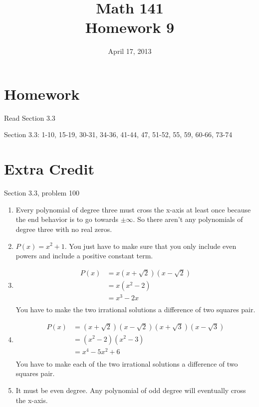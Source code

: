 \documentclass{exam}
\date{April 17, 2013}
\author{}
\title{Math 141 \\ Homework 9}
\begin{document}
  \maketitle

  \section{Homework}

  \begin{itemize*}
    \item Read Section 3.3
    \item Section 3.3: 1-10, 15-19, 30-31, 34-36, 41-44, 47, 51-52, 55, 59, 60-66, 73-74 
  \end{itemize*}

  \section{Extra Credit}
  Section 3.3, problem 100

  \begin{solution}
    \begin{enumerate}[a]
      \item Every polynomial of degree three must cross the x-axis at least once because the end behavior is to go
        towards $\pm \infty$.  So there aren't any polynomials of degree three with no real zeros.

      \item $P(x) = x^2 + 1$.  You just have to make sure that you only include even powers and include a positive
        constant term.

      \item 
        \begin{align*}
          P(x) &= x(x + \sqrt{2})(x - \sqrt{2}) \\
               &= x(x^2 - 2) \\
               &= x^3 - 2x \\
        \end{align*}
        You have to make the two irrational solutions a difference of two squares pair.

      \item
        \begin{align*}
          P(x) &= (x + \sqrt{2})(x - \sqrt{2})(x + \sqrt{3})(x - \sqrt{3}) \\
               &= (x^2 - 2)(x^2 - 3) \\
               &= x^4 - 5x^2 + 6 \\
        \end{align*}
        You have to make each of the two irrational solutions a difference of two squares pair.

      \item It must be even degree.  Any polynomial of odd degree will eventually cross the x-axis.

    \end{enumerate}
  \end{solution}
\end{document}
